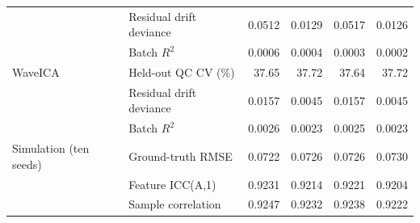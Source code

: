 \begin{longtable}{llrrrr}
 & Residual drift deviance & 0.0512 & 0.0129 & 0.0517 & 0.0126 \\
 & Batch $R^2$ & 0.0006 & 0.0004 & 0.0003 & 0.0002 \\
\midrule
WaveICA & Held-out QC CV (\%) & 37.65 & 37.72 & 37.64 & 37.72 \\
 & Residual drift deviance & 0.0157 & 0.0045 & 0.0157 & 0.0045 \\
 & Batch $R^2$ & 0.0026 & 0.0023 & 0.0025 & 0.0023 \\
\midrule
Simulation (ten seeds) & Ground-truth RMSE & 0.0722 & 0.0726 & 0.0726 & 0.0730 \\
 & Feature ICC(A,1) & 0.9231 & 0.9214 & 0.9221 & 0.9204 \\
 & Sample correlation & 0.9247 & 0.9232 & 0.9238 & 0.9222 \\
\end{longtable}
